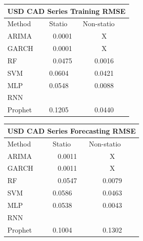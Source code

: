 \documentclass[10pt,twocolumn,letterpaper]{article}
\begin{document}
	
	\begin{table}[h]\label{table:usdcadtrainingRMSE}
		\centering
		\begin{tabular}{|lll|}
			\hline
			\multicolumn{3}{|c|}{USD CAD Series Training RMSE}                                                  \\ \hline
			\multicolumn{1}{|l|}{Method}  & \multicolumn{1}{l|}{Statio} & Non-statio             \\ \hline
			\multicolumn{1}{|l|}{ARIMA}   & \multicolumn{1}{c|}{0.0001}       & \multicolumn{1}{c|}{X} \\ \hline
			\multicolumn{1}{|l|}{GARCH}   & \multicolumn{1}{c|}{0.0001}       & \multicolumn{1}{c|}{X} \\ \hline
			\multicolumn{1}{|l|}{RF}      & \multicolumn{1}{c|}{0.0475}       & \multicolumn{1}{c|}{0.0016}  \\ \hline
			\multicolumn{1}{|l|}{SVM}     & \multicolumn{1}{l|}{0.0604}       & \multicolumn{1}{c|}{0.0421}  \\ \hline
			\multicolumn{1}{|l|}{MLP}     & \multicolumn{1}{l|}{0.0548}       & \multicolumn{1}{c|}{0.0088}  \\ \hline
			\multicolumn{1}{|l|}{RNN}     & \multicolumn{1}{l|}{}       & \multicolumn{1}{c|}{}  \\ \hline
			\multicolumn{1}{|l|}{Prophet} & \multicolumn{1}{l|}{0.1205}       & \multicolumn{1}{c|}{0.0440}  \\ \hline
		\end{tabular}
	\end{table}
	
	\begin{table}[h]
		\label{table:usdcadforecastRMSE}
		\centering
		\begin{tabular}{|lll|}
			\hline
			\multicolumn{3}{|c|}{USD CAD Series Forecasting RMSE}                                                  \\ \hline
			\multicolumn{1}{|l|}{Method}  & \multicolumn{1}{l|}{Statio} & Non-statio             \\ \hline
			\multicolumn{1}{|l|}{ARIMA}   & \multicolumn{1}{c|}{0.0011}       & \multicolumn{1}{c|}{X} \\ \hline
			\multicolumn{1}{|l|}{GARCH}   & \multicolumn{1}{c|}{0.0011}       & \multicolumn{1}{c|}{X} \\ \hline
			\multicolumn{1}{|l|}{RF}      & \multicolumn{1}{c|}{0.0547}       & \multicolumn{1}{c|}{0.0079}  \\ \hline
			\multicolumn{1}{|l|}{SVM}     & \multicolumn{1}{l|}{0.0586}       & \multicolumn{1}{c|}{0.0463}  \\ \hline
			\multicolumn{1}{|l|}{MLP}     & \multicolumn{1}{l|}{0.0538}       & \multicolumn{1}{c|}{0.0043}  \\ \hline
			\multicolumn{1}{|l|}{RNN}     & \multicolumn{1}{l|}{}       & \multicolumn{1}{c|}{}  \\ \hline
			\multicolumn{1}{|l|}{Prophet} & \multicolumn{1}{l|}{0.1004}       & \multicolumn{1}{c|}{0.1302}  \\ \hline
		\end{tabular}
	\end{table}
	
\end{document}

